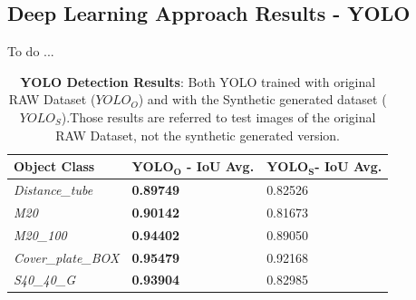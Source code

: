 \subsection{Deep Learning Approach Results - YOLO}\label{subsec:yolo_obj_det_results}
To do ...


\begin{table}[!hbt]
	\centering
    \begin{tabular}{| l | l | l |}
    \hline
    \textbf{Object Class} & \textbf{$\pmb{YOLO_O}$ - IoU Avg.} & \textbf{$\pmb{YOLO_S}$- IoU Avg.}\\ \hline
    \emph{Distance\_tube} & \textbf{0.89749} & 0.82526 \\
    \emph{M20} & \textbf{0.90142} & 0.81673 \\
    \emph{M20\_100} & \textbf{0.94402} & 0.89050 \\
    \emph{Cover\_plate\_BOX} & \textbf{0.95479} & 0.92168 \\
    \emph{S40\_40\_G} & \textbf{0.93904} & 0.82985 \\
    \hline
    \end{tabular}
    \caption{\textbf{YOLO Detection Results}: Both YOLO trained with original RAW Dataset ($YOLO_O$) and with the Synthetic generated dataset ($YOLO_S$).Those results are referred to test images of the original RAW Dataset, not the synthetic generated version.}
    \label{tab:dl_YOLO_results_unified}
\end{table}

